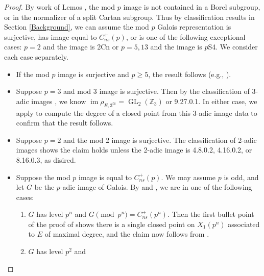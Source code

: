 \documentclass{amsart}
\theoremstyle{definition}
\newcommand{\Z}{\mathbb{Z}}
\newcommand{\GL}{\operatorname{GL}}
\DeclareMathOperator{\im}{im}
\begin{document}
\begin{proof}
    By work of Lemos \cite{lemosTrans,lemosZ}, the mod $p$ image is not contained in a Borel subgroup, or in the normalizer of a split Cartan subgroup. Thus by classification results in Section \ref{Background}, we can assume the mod $p$ Galois representation is surjective, has image equal to $C_{ns}^+(p)$, or is one of the following exceptional cases: $p=2$ and the image is 2Cn or $p=5,13$ and the image is $p$S4. We consider each case separately.
    \begin{itemize}
            \item If the mod $p$ image is surjective and $p \geq 5$, the result follows (e.g., \cite[Corollary 2.13]{Greicius10}).
        \item Suppose $p=3$ and mod 3 image is surjective. Then by the classification of 3-adic images \cite{RouseSutherlandZB22,3adicImage}, we know $\im \rho_{E,3^{\infty}}=\GL_2(\Z_3)$ or  9.27.0.1. In either case, we apply \cite[Proposition 34]{Algorithm2025} to compute the degree of a closed point from this $3$-adic image data to confirm that the result follows.
        \item Suppose $p=2$ and the mod 2 image is surjective. The classification of 2-adic images \cite{2adicImage} shows the claim holds unless the 2-adic image is 4.8.0.2, 4.16.0.2, or 8.16.0.3, as disired.
        \item Suppose the mod $p$ image is equal to $C_{ns}^+(p)$. We may assume $p$ is odd, and let $G$ be the $p$-adic image of Galois. By \cite[Theorem 6.5]{Furio2024} and \cite[Proposition 2.2]{Furio2024}, we are in one of the following cases:
        \begin{enumerate}
            \item $G$ has level $p^n$ and $G\pmod{p^n}=C_{ns}^+(p^n)$. Then the first bullet point of the proof of \cite[Theorem 6]{BourdonEjder} shows there is a single closed point on $X_1(p^n)$ associated to $E$ of maximal degree, and the claim now follows from \cite[Theorem 5.1]{BELOV}.
            \item $G$ has level $p^2$ and


\end{enumerate}
\end{itemize}
\end{proof}
\end{document}
